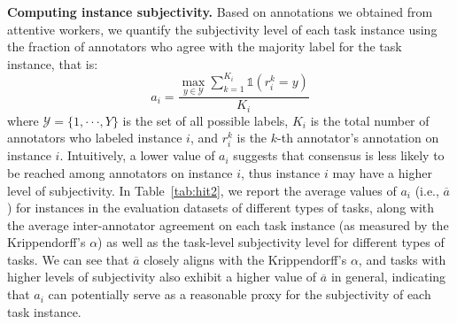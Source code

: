 \noindent \textbf{Computing instance subjectivity.}
Based on annotations we obtained from attentive workers, 
we quantify the subjectivity level of each task instance using the fraction of annotators who agree with the majority label for the task instance, that is: 
\begin{equation}
    a_i = \frac{{\max}_{y \in \mathcal{Y}} \sum_{k=1}^{K_i} \mathds{1}{(r_{i}^{k} = y)}}{K_i}
\end{equation}
where $\mathcal{Y}=\{1,\cdot\cdot\cdot, Y\}$ is the set of all possible labels, $K_i$ is the total number of annotators who labeled instance $i$, and $r_{i}^{k}$ is the $k$-th annotator's annotation on instance $i$. Intuitively, a lower value of $a_i$ suggests that consensus is less likely to be reached among annotators on  instance $i$, thus instance $i$ may have a higher level of subjectivity.  In Table~\ref{tab:hit2}, we report the average values of
$a_i$
(i.e., $\overline{a}$) for instances in the evaluation datasets of different types of tasks, along with the average inter-annotator agreement on each task instance (as measured by the Krippendorff's $\alpha$) as well as the task-level subjectivity level for different types of tasks. We can see that 
$\overline{a}$ closely aligns with the Krippendorff's $\alpha$, and tasks with higher levels of subjectivity also exhibit a higher value of $\overline{a}$ in general, indicating that $a_i$ can potentially serve as a reasonable proxy for the subjectivity of each task instance.     

